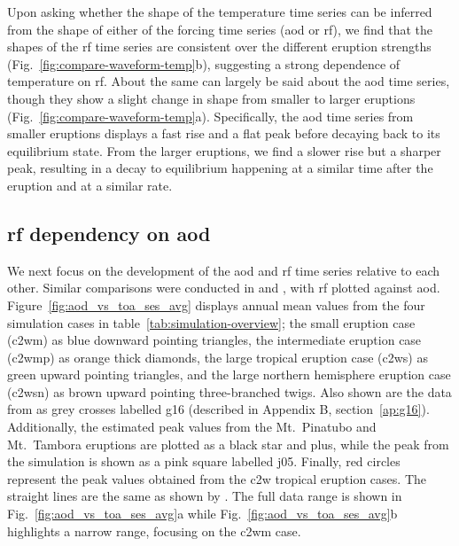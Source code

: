 \documentclass{ametsocV6.1}
\begin{document}
Upon asking whether the shape of the temperature time series can be inferred from the
shape of either of the forcing time series (\gls{aod} or \gls{rf}), we find that the
shapes of the \gls{rf} time series are consistent over the different eruption strengths
(Fig.~\ref{fig:compare-waveform-temp}b), suggesting a strong dependence of temperature
on \gls{rf}. About the same can largely be said about the \gls{aod} time series, though
they show a slight change in shape from smaller to larger eruptions
(Fig.~\ref{fig:compare-waveform-temp}a). Specifically, the \gls{aod} time series from
smaller eruptions displays a fast rise and a flat peak before decaying back to its
equilibrium state. From the larger eruptions, we find a slower rise but a sharper peak,
resulting in a decay to equilibrium happening at a similar time after the eruption and
at a similar rate.

\subsection{\gls{rf} dependency on \gls{aod}}

We next focus on the development of the \gls{aod} and \gls{rf} time series relative to
each other. Similar comparisons were conducted in \citet[][their Fig.\ 4]{gregory2016}
and \citet[][their Fig.\ 1]{marshall2020}, with \gls{rf} plotted against \gls{aod}.
Figure~\ref{fig:aod_vs_toa_ses_avg} displays annual mean values from the four simulation
cases in table~\ref{tab:simulation-overview}; the small eruption case (\gls{c2wm}) as
blue downward pointing triangles, the intermediate eruption case (\gls{c2wmp}) as orange
thick diamonds, the large tropical eruption case (\gls{c2ws}) as green upward pointing
triangles, and the large northern hemisphere eruption case (\gls{c2wsn}) as brown upward
pointing three-branched twigs. Also shown are the data from \citet[][Fig.\ 4, black
  crosses from HadCM3 sstPiHistVol]{gregory2016} as grey crosses labelled \gls{g16}
(described in Appendix B, section~\ref{ap:g16}). Additionally, the estimated peak values
from the Mt.\ Pinatubo and Mt.\ Tambora eruptions are plotted as a black star and plus,
while the peak from the \citet{jones2005} simulation is shown as a pink square labelled
\gls{j05}. Finally, red circles represent the peak values obtained from the \gls{c2w}
tropical eruption cases. The straight lines are the same as shown by
\citet{gregory2016}. The full data range is shown in Fig.~\ref{fig:aod_vs_toa_ses_avg}a
while Fig.~\ref{fig:aod_vs_toa_ses_avg}b highlights a narrow range, focusing on the
\gls{c2wm} case.
\end{document}
